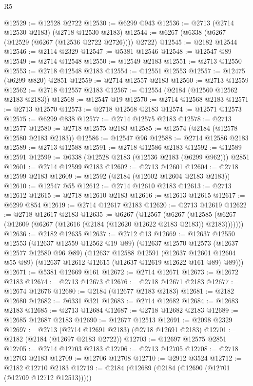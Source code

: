 \begin{lexlean}{R5}
\begin{coremodule}
@12529 := @12528 @2722
@12530 := @6299 @943
@12536 := @2713 (@2714 @12530 @2183) (@2718 @12530 @2183)
@12544 := @6267 (@6338 (@6267 (@12529 (@6267 (@12536 @2722 @2726)))) @2722)
@12545 := @2182 @12544
@12546 := @2114 @2329
@12547 := @5381 @12546
@12548 := @12547 @89
@12549 := @2714 @12548
@12550 := @12549 @2183
@12551 := @2713 @12550
@12553 := @2718 @12548 @2183
@12554 := @12551 @12553
@12557 := @12475 (@6299 @820) @2851
@12559 := @2714 @12557 @2183
@12560 := @2713 @12559
@12562 := @2718 @12557 @2183
@12567 := @12554 (@2184 (@12560 @12562 @2183 @2183))
@12568 := @12547 @19
@12570 := @2714 @12568 @2183
@12571 := @2713 @12570
@12573 := @2718 @12568 @2183
@12574 := @12571 @12573
@12575 := @6299 @838
@12577 := @2714 @12575 @2183
@12578 := @2713 @12577
@12580 := @2718 @12575 @2183
@12585 := @12574 (@2184 (@12578 @12580 @2183 @2183))
@12586 := @12547 @96
@12588 := @2714 @12586 @2183
@12589 := @2713 @12588
@12591 := @2718 @12586 @2183
@12592 := @12589 @12591
@12599 := @6338 (@12528 @2183 (@12536 @2183 (@6299 @962))) @2851
@12601 := @2714 @12599 @2183
@12602 := @2713 @12601
@12604 := @2718 @12599 @2183
@12609 := @12592 (@2184 (@12602 @12604 @2183 @2183))
@12610 := @12547 @55
@12612 := @2714 @12610 @2183
@12613 := @2713 @12612
@12615 := @2718 @12610 @2183
@12616 := @12613 @12615
@12617 := @6299 @854
@12619 := @2714 @12617 @2183
@12620 := @2713 @12619
@12622 := @2718 @12617 @2183
@12635 := @6267
    (@12567
      (@6267 (@12585 (@6267 (@12609 (@6267 (@12616 (@2184 (@12620 @12622 @2183 @2183)) @2183)))))))
@12636 := @2182 @12635
@12637 := @2712 @13
@12669 := @12637
    @12550
    @12553
    (@12637 @12559 @12562 @19 @89)
    (@12637
      @12570
      @12573
      (@12637 @12577 @12580 @96 @89)
      (@12637
        @12588
        @12591
        (@12637 @12601 @12604 @55 @89)
        (@12637 @12612 @12615 (@12637 @12619 @12622 @161 @89) @89)))
@12671 := @5381 @12669 @161
@12672 := @2714 @12671
@12673 := @12672 @2183
@12674 := @2713 @12673
@12676 := @2718 @12671 @2183
@12677 := @12674 @12676
@12680 := @2184 (@12677 @2183 @2183)
@12681 := @2182 @12680
@12682 := @6331 @321
@12683 := @2714 @12682
@12684 := @12683 @2183
@12685 := @2713 @12684
@12687 := @2718 @12682 @2183
@12689 := @12685 @12687 @2183
@12690 := @12677 @12513
@12691 := @2098 @2329
@12697 := @2713 (@2714 @12691 @2183) (@2718 @12691 @2183)
@12701 := @2182 (@2184 (@12697 @2183 @2722))
@12703 := @12697 @12575 @2851
@12705 := @2714 @12703 @2183
@12706 := @2713 @12705
@12708 := @2718 @12703 @2183
@12709 := @12706 @12708
@12710 := @2912 @3524
@12712 := @2182 @12710 @2183
@12719 := @2184 (@12689 (@2184 (@12690 (@12701 (@12709 @12712 @12513)))))

\end{coremodule}
\end{lexlean}
